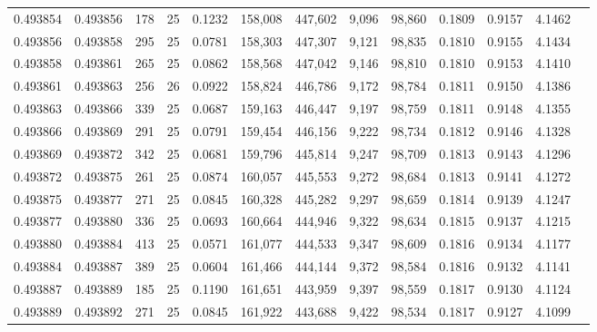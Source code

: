 \begin{tabular}{rrrrrrrrrrrrr}
0.493854 & 0.493856 &   178 &  25 &                                     0.1232 & 158,008 & 447,602 &   9,096 &  98,860 & 0.1809 & 0.9157 & 4.1462 \\
0.493856 & 0.493858 &   295 &  25 &                                     0.0781 & 158,303 & 447,307 &   9,121 &  98,835 & 0.1810 & 0.9155 & 4.1434 \\
0.493858 & 0.493861 &   265 &  25 &                                     0.0862 & 158,568 & 447,042 &   9,146 &  98,810 & 0.1810 & 0.9153 & 4.1410 \\
0.493861 & 0.493863 &   256 &  26 &                                     0.0922 & 158,824 & 446,786 &   9,172 &  98,784 & 0.1811 & 0.9150 & 4.1386 \\
0.493863 & 0.493866 &   339 &  25 &                                     0.0687 & 159,163 & 446,447 &   9,197 &  98,759 & 0.1811 & 0.9148 & 4.1355 \\
0.493866 & 0.493869 &   291 &  25 &                                     0.0791 & 159,454 & 446,156 &   9,222 &  98,734 & 0.1812 & 0.9146 & 4.1328 \\
0.493869 & 0.493872 &   342 &  25 &                                     0.0681 & 159,796 & 445,814 &   9,247 &  98,709 & 0.1813 & 0.9143 & 4.1296 \\
0.493872 & 0.493875 &   261 &  25 &                                     0.0874 & 160,057 & 445,553 &   9,272 &  98,684 & 0.1813 & 0.9141 & 4.1272 \\
0.493875 & 0.493877 &   271 &  25 &                                     0.0845 & 160,328 & 445,282 &   9,297 &  98,659 & 0.1814 & 0.9139 & 4.1247 \\
0.493877 & 0.493880 &   336 &  25 &                                     0.0693 & 160,664 & 444,946 &   9,322 &  98,634 & 0.1815 & 0.9137 & 4.1215 \\
0.493880 & 0.493884 &   413 &  25 &                                     0.0571 & 161,077 & 444,533 &   9,347 &  98,609 & 0.1816 & 0.9134 & 4.1177 \\
0.493884 & 0.493887 &   389 &  25 &                                     0.0604 & 161,466 & 444,144 &   9,372 &  98,584 & 0.1816 & 0.9132 & 4.1141 \\
0.493887 & 0.493889 &   185 &  25 &                                     0.1190 & 161,651 & 443,959 &   9,397 &  98,559 & 0.1817 & 0.9130 & 4.1124 \\
0.493889 & 0.493892 &   271 &  25 &                                     0.0845 & 161,922 & 443,688 &   9,422 &  98,534 & 0.1817 & 0.9127 & 4.1099 \\

\end{tabular}
